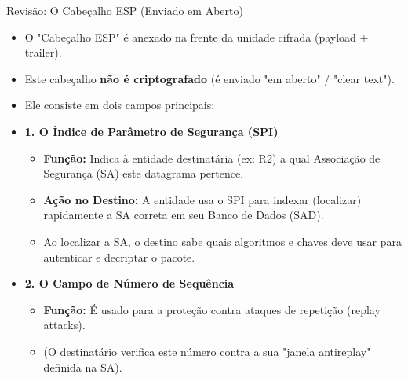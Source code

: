 \begin{frame}{Revisão: O Cabeçalho ESP (Enviado em Aberto)}
    \begin{itemize}
        \item O "Cabeçalho ESP" é anexado na frente da unidade cifrada (payload + trailer).
        \item Este cabeçalho \textbf{não é criptografado} (é enviado "em aberto" / "clear text").
        \item Ele consiste em dois campos principais:

        \item \textbf{1. O Índice de Parâmetro de Segurança (SPI)}
              \begin{itemize}
                  \item \textbf{Função:} Indica à entidade destinatária (ex: R2) a qual Associação de Segurança (SA) este datagrama pertence.
                  \item \textbf{Ação no Destino:} A entidade usa o SPI para indexar (localizar) rapidamente a SA correta em seu Banco de Dados (SAD).
                  \item Ao localizar a SA, o destino sabe quais algoritmos e chaves deve usar para autenticar e decriptar o pacote.
              \end{itemize}

        \item \textbf{2. O Campo de Número de Sequência}
              \begin{itemize}
                  \item \textbf{Função:} É usado para a proteção contra ataques de repetição (replay attacks).
                  \item (O destinatário verifica este número contra a sua "janela antireplay" definida na SA).
              \end{itemize}
    \end{itemize}
\end{frame}


